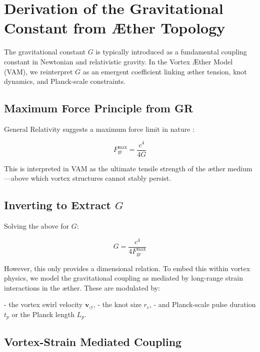 
\section{Derivation of the Gravitational Constant from Æther Topology}
\label{appendix:G}

The gravitational constant \( G \) is typically introduced as a fundamental coupling constant in Newtonian and relativistic gravity. In the Vortex Æther Model (VAM), we reinterpret \( G \) as an emergent coefficient linking æther tension, knot dynamics, and Planck-scale constraints.

\subsection*{Maximum Force Principle from GR}

General Relativity suggests a maximum force limit in nature \cite{scharf2016force, barcelo2011}:

\begin{equation}
    F^{\text{max}}_{\text{gr}} = \frac{c^4}{4G}
\end{equation}

This is interpreted in VAM as the ultimate tensile strength of the æther medium—above which vortex structures cannot stably persist.

\subsection*{Inverting to Extract \( G \)}

Solving the above for \( G \):

\begin{equation}
    G = \frac{c^4}{4 F^{\text{max}}_{\text{gr}}}
\end{equation}

However, this only provides a dimensional relation. To embed this within vortex physics, we model the gravitational coupling as mediated by long-range strain interactions in the æther. These are modulated by:

- the vortex swirl velocity \( \mathbf{v}_{\scriptscriptstyle\boldsymbol{\circlearrowleft}} \),
- the knot size \( r_c \),
- and Planck-scale pulse duration \( t_p \) or the Planck length \( L_p \).

\subsection*{Vortex-Strain Mediated Coupling}

